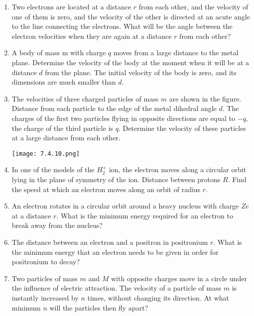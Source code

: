 \documentclass{article}
\begin{document}
\begin{enumerate}[label=7.4.\arabic*]
\item Two electrons are located at a distance $r$ from each other, and the velocity of one of them is zero, and the velocity of the other is directed at an acute angle to the line connecting the electrons. What will be the angle between the electron velocities when they are again at a distance $r$ from each other?

\item A body of mass m with charge $q$ moves from a large distance to the metal plane. Determine the velocity of the body at the moment when it will be at a distance $d$ from the plane. The initial velocity of the body is zero, and its dimensions are much smaller than $d$.

\item The velocities of three charged particles of mass $m$ are shown in the figure. Distance from each particle to the edge of the metal dihedral angle $d$. The charges of the first two particles flying in opposite directions are equal to $-q$, the charge of the third particle is $q$. Determine the velocity of these particles at a large distance from each other.

\begin{center}
    \texttt{[image: 7.4.10.png]}
\end{center}


\item In one of the models of the $H^+_2$ ion, the electron moves along a circular orbit lying in the plane of symmetry of the ion. Distance between protons $R$. Find the speed at which an electron moves along an orbit of radius $r$.

\item An electron rotates in a circular orbit around a heavy nucleus with charge $Ze$ at a distance $r$. What is the minimum energy required for an electron to break away from the nucleus?

\item The distance between an electron and a positron in positronium $r$. What is the minimum energy that an electron needs to be given in order for positronium to decay?

\item Two particles of mass $m$ and $M$ with opposite charges move in a circle under the influence of electric attraction. The velocity of a particle of mass $m$ is instantly increased by $n$ times, without changing its direction. At what minimum $n$ will the particles then fly apart?


\end{enumerate}
\end{document}

